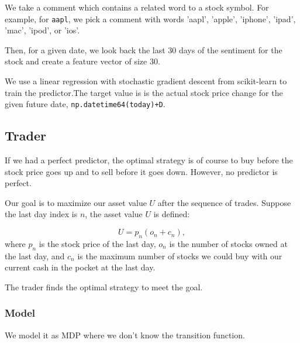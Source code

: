 \documentclass[twocolumn,10pt]{asme2ej}
\begin{document}
We take a comment which contains a related word to a stock symbol. For
example, for \verb|aapl|, we pick a comment with words 'aapl',
'apple', 'iphone', 'ipad', 'mac', 'ipod', or 'ios'.

Then, for a given date, we look back the last 30 days of the sentiment
for the stock and create a feature vector of size 30.

We use a linear regression with stochastic gradient descent from
scikit-learn \cite{web:scikit_learn} to train the predictor.The target
value is is the actual stock price change for the given future date,
\verb|np.datetime64(today)+D|.

\subsection{Trader}

If we had a perfect predictor, the optimal strategy is of course to
buy before the stock price goes up and to sell before it goes
down. However, no predictor is perfect.

Our goal is to maximize our asset value $U$ after the sequence of
trades. Suppose the last day index is $n$, the asset value $U$ is defined:

\[
U = p_n(o_n + c_n),
\]
where $p_n$ is the stock price of the last day, $o_n$ is the number
of stocks owned at the last day, and $c_n$ is the maximum number of
stocks we could buy with our current cash in the pocket at the last
day.

The trader finds the optimal strategy to meet the goal.

\subsubsection{Model}

We model it as MDP where we don't know the transition function.
\end{document}
